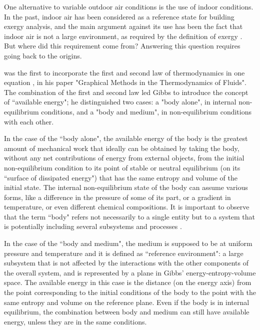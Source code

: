 \documentclass[10pt]{extarticle} %
\begin{document}
%
%
%


One alternative to variable outdoor air conditions is the use of indoor conditions. In the past, indoor air has been considered as a reference state for building exergy analysis, and the main argument against its use has been the fact that indoor air is not a large environment, as required by the definition of exergy \citep{Schmidt2011}. But where did this requirement come from? Answering this question requires going back to the origins.

\cite{Gibbs1873} was the first to incorporate the first and second law of thermodynamics in one equation \citep{Klein1990}, in his paper "Graphical Methods in the Thermodyna\-mics of Fluids".  The combination of the first and second law led Gibbs to introduce the concept of ``available energy"; he distinguished two cases: a "body alone", in internal non-equilibrium conditions, and a "body and medium", in non-equilibrium conditions with each other. 

In the case of the ``body alone", the available energy of the body is the greatest amount of mechanical work that ideally can be obtained by taking the body, without any net contributions of energy from external objects, from the initial non-equilibrium condition to its point of stable or neutral equilibrium (on its ``surface of dissipated energy") that has the same entropy and volume of the initial state. The internal non-equilibrium state of the body can assume various forms, like a difference in the pressure of some of its part, or a gradient in temperature, or even different chemical compositions. It is important to observe that the term ``body" refers not necessarily to a single entity but to a system that is potentially including several subsystems and processes \citep{Gaggioli2012}.
 
In the case of the ``body and medium", the medium is supposed to be at uniform pressure and temperature and it is defined as ``reference environment": a large subsystem that is not affected by the interactions with the other components of the overall system, and is represented by a plane in Gibbs' energy-entropy-volume space. The available energy in this case is the distance (on the energy axis) from the point corresponding to the initial conditions of the body to the point with the same entropy and volume on the reference plane. Even if the body is in internal equilibrium, the combination between body and medium can still have available energy, unless they are in the same conditions. 
\end{document}
